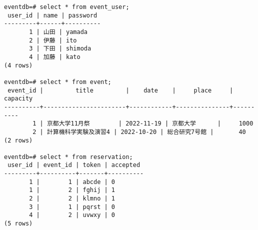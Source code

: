 \documentclass[dvipdfmx]{jarticle}
\begin{document}
\begin{lstlisting}[caption=insertion\_result]
eventdb=# select * from event_user;
 user_id | name | password
---------+------+----------
       1 | 山田 | yamada
       2 | 伊藤 | ito
       3 | 下田 | shimoda
       4 | 加藤 | kato
(4 rows)

eventdb=# select * from event;
 event_id |         title         |    date    |     place     | capacity
----------+-----------------------+------------+---------------+----------
        1 | 京都大学11月祭        | 2022-11-19 | 京都大学      |     1000
        2 | 計算機科学実験及演習4 | 2022-10-20 | 総合研究7号館 |       40
(2 rows)

eventdb=# select * from reservation;
 user_id | event_id | token | accepted
---------+----------+-------+----------
       1 |        1 | abcde | 0
       1 |        2 | fghij | 1
       2 |        2 | klmno | 1
       3 |        1 | pqrst | 0
       4 |        2 | uvwxy | 0
(5 rows)
\end{lstlisting}
\end{document}
